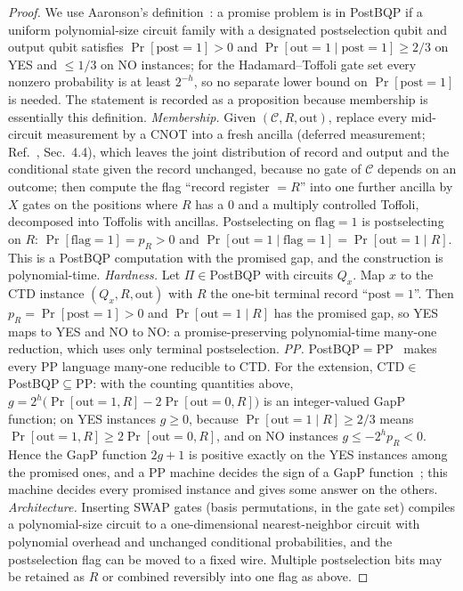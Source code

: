 \documentclass[aps,prx,reprint,superscriptaddress,nobibnotes,longbibliography]{revtex4-2}
\theoremstyle{remark}
\begin{document}
\begin{proof}
We use Aaronson's definition~\cite{Aaronson2005}: a promise problem is in PostBQP if a uniform polynomial-size circuit family with a designated postselection qubit and output qubit satisfies $\Pr[\mathrm{post}=1]>0$ and $\Pr[\mathrm{out}=1\mid\mathrm{post}=1]\ge2/3$ on YES and $\le1/3$ on NO instances; for the Hadamard--Toffoli gate set every nonzero probability is at least $2^{-h}$, so no separate lower bound on $\Pr[\mathrm{post}=1]$ is needed.  The statement is recorded as a proposition because membership is essentially this definition.  \emph{Membership.}  Given $(\mathcal C,R,\mathrm{out})$, replace every mid-circuit measurement by a CNOT into a fresh ancilla (deferred measurement; Ref.~\cite{NielsenChuang2010}, Sec.~4.4), which leaves the joint distribution of record and output and the conditional state given the record unchanged, because no gate of $\mathcal C$ depends on an outcome; then compute the flag ``record register $=R$'' into one further ancilla by $X$ gates on the positions where $R$ has a $0$ and a multiply controlled Toffoli, decomposed into Toffolis with ancillas.  Postselecting on $\mathrm{flag}=1$ is postselecting on $R$: $\Pr[\mathrm{flag}=1]=p_R>0$ and $\Pr[\mathrm{out}=1\mid\mathrm{flag}=1]=\Pr[\mathrm{out}=1\mid R]$.  This is a PostBQP computation with the promised gap, and the construction is polynomial-time.  \emph{Hardness.}  Let $\Pi\in{}$PostBQP with circuits $Q_x$.  Map $x$ to the CTD instance $(Q_x,R,\mathrm{out})$ with $R$ the one-bit terminal record ``$\mathrm{post}=1$''.  Then $p_R=\Pr[\mathrm{post}=1]>0$ and $\Pr[\mathrm{out}=1\mid R]$ has the promised gap, so YES maps to YES and NO to NO: a promise-preserving polynomial-time many-one reduction, which uses only terminal postselection.  \emph{PP.}  PostBQP$=$PP~\cite{Aaronson2005} makes every PP language many-one reducible to CTD.  For the extension, CTD$\in$PostBQP$\subseteq$PP: with the counting quantities above, $g=2^h\bigl(\Pr[\mathrm{out}=1,R]-2\Pr[\mathrm{out}=0,R]\bigr)$ is an integer-valued GapP function; on YES instances $g\ge0$, because $\Pr[\mathrm{out}=1\mid R]\ge2/3$ means $\Pr[\mathrm{out}=1,R]\ge2\Pr[\mathrm{out}=0,R]$, and on NO instances $g\le-2^hp_R<0$.  Hence the GapP function $2g+1$ is positive exactly on the YES instances among the promised ones, and a PP machine decides the sign of a GapP function~\cite{Fenner1994}; this machine decides every promised instance and gives some answer on the others.  \emph{Architecture.}  Inserting SWAP gates (basis permutations, in the gate set) compiles a polynomial-size circuit to a one-dimensional nearest-neighbor circuit with polynomial overhead and unchanged conditional probabilities, and the postselection flag can be moved to a fixed wire.  Multiple postselection bits may be retained as $R$ or combined reversibly into one flag as above.
\end{proof}
\end{document}
